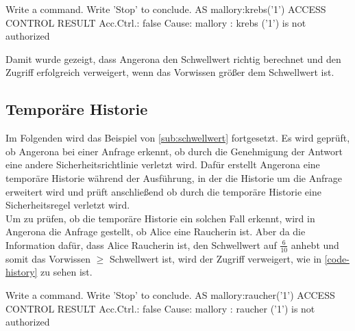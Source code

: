 \documentclass[german,version-2020-11]{uzl-thesis}
\begin{document}
\begin{Pseudocode}[caption={Angerona Ergebnis für den Schwellwert $34/80$}, label={code-thresholdNoAccess}]
Write a command. Write 'Stop' to conclude.
AS mallory:krebs('1')
ACCESS CONTROL RESULT
	Acc.Ctrl.: false Cause: mallory : krebs ('1') is not authorized
\end{Pseudocode}
Damit wurde gezeigt, dass Angerona den Schwellwert richtig berechnet und den Zugriff erfolgreich verweigert, wenn das Vorwissen größer dem Schwellwert ist.

\subsection{Temporäre Historie}
Im Folgenden wird das Beispiel von \cref{sub:schwellwert} fortgesetzt. Es wird geprüft, ob Angerona bei einer Anfrage erkennt, ob durch die Genehmigung der Antwort eine andere Sicherheitsrichtlinie verletzt wird. Dafür erstellt Angerona eine temporäre Historie während der Ausführung, in der die Historie um die Anfrage erweitert wird und prüft anschließend ob durch die temporäre Historie eine Sicherheitsregel verletzt wird. \\ 
Um zu prüfen, ob die temporäre Historie ein solchen Fall erkennt, wird in Angerona die Anfrage gestellt, ob Alice eine Raucherin ist. Aber da die Information dafür, dass Alice Raucherin ist, den Schwellwert auf $\frac{6}{10}$ anhebt und somit das Vorwissen $\geq$ Schwellwert ist, wird der Zugriff verweigert, wie in \autoref{code-history} zu sehen ist. 

\begin{Pseudocode}[caption={Angerona Ergebnis für die Abfrage, ob Alice Raucherin ist}, label={code-history}]
Write a command. Write 'Stop' to conclude.
AS mallory:raucher('1')
ACCESS CONTROL RESULT
	Acc.Ctrl.: false Cause: mallory : raucher ('1') is not authorized
\end{Pseudocode}
\end{document}
